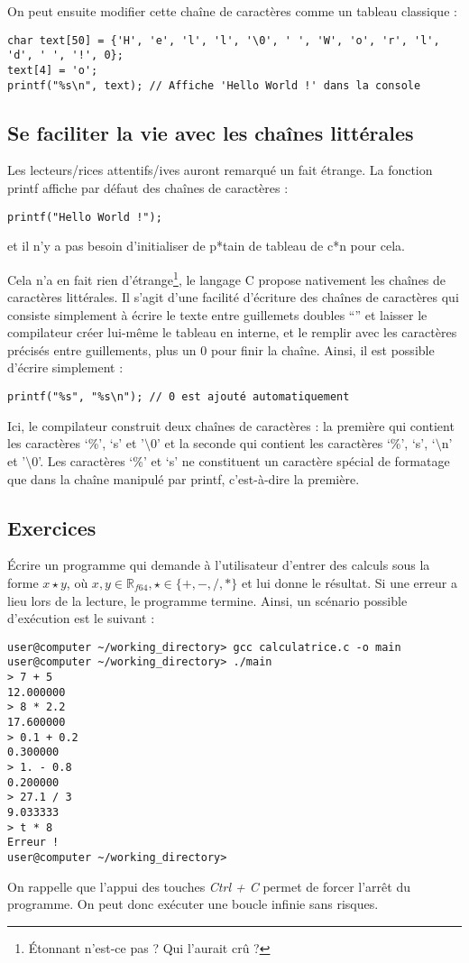 \documentclass[../../../main.tex]{subfiles}
\begin{document}
On peut ensuite modifier cette chaîne de caractères comme un tableau classique :
\begin{verbatim}
char text[50] = {'H', 'e', 'l', 'l', '\0', ' ', 'W', 'o', 'r', 'l', 'd', ' ', '!', 0};
text[4] = 'o';
printf("%s\n", text); // Affiche 'Hello World !' dans la console
\end{verbatim}
\subsection{Se faciliter la vie avec les chaînes littérales}
Les lecteurs/rices attentifs/ives auront remarqué un fait étrange. La fonction \textsf{printf} affiche par défaut des chaînes de caractères :
\begin{verbatim}
printf("Hello World !");
\end{verbatim}
et il n'y a pas besoin d'initialiser de p*tain de tableau de c*n pour cela.
 
Cela n'a en fait rien d'étrange\footnote{Étonnant n'est-ce pas ? Qui l'aurait crû ?}, le langage C propose nativement les chaînes de caractères littérales. Il s'agit d'une facilité d'écriture des chaînes de caractères qui consiste simplement à écrire le texte entre guillemets doubles ``'' et laisser le compilateur créer lui-même le tableau en interne, et le remplir avec les caractères précisés entre guillements, plus un 0 pour finir la chaîne.\newline
Ainsi, il est possible d'écrire simplement :
\begin{verbatim}
printf("%s", "%s\n"); // 0 est ajouté automatiquement
\end{verbatim}
Ici, le compilateur construit deux chaînes de caractères : la première qui contient les caractères `\%', `s' et '$\setminus{0}$' et la seconde qui contient les caractères `\%', `s', `$\setminus$n' et '$\setminus0$'. Les caractères `\%' et `s' ne constituent un caractère spécial de formatage que dans la chaîne manipulé par \textsf{printf}, c'est-à-dire la première.
\subsection{Exercices}
Écrire un programme qui demande à l'utilisateur d'entrer des calculs sous la forme $x\star y$, où $x, y\in{\mathbb{R}_{f64}}, \star\in\{+, -, /, *\}$ et lui donne le résultat. Si une erreur a lieu lors de la lecture, le programme termine. Ainsi, un scénario possible d'exécution est le suivant :
\begin{verbatim}
user@computer ~/working_directory> gcc calculatrice.c -o main
user@computer ~/working_directory> ./main
> 7 + 5
12.000000
> 8 * 2.2
17.600000
> 0.1 + 0.2
0.300000
> 1. - 0.8
0.200000
> 27.1 / 3
9.033333
> t * 8
Erreur !
user@computer ~/working_directory>
\end{verbatim}
On rappelle que l'appui des touches \textit{Ctrl + C} permet de forcer l'arrêt du programme. On peut donc exécuter une boucle infinie sans risques.
 
\end{document}
